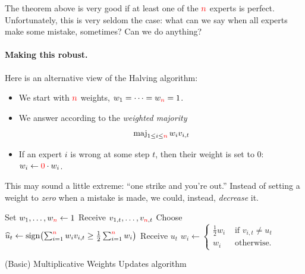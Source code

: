 The theorem above is very good if at least one of the ${\textcolor{red}{n}}$ experts is perfect. Unfortunately, this is very seldom the case: what can we say when all experts make some mistake, sometimes? Can we do anything?

\paragraph{Making this robust.}
Here is an alternative view of the Halving algorithm:
\begin{itemize}
    \item We start with ${\textcolor{red}{n}}$ weights, $w_1=\dots = w_{\textcolor{red}{n}} = 1$.
    \item We answer according to the \emph{weighted majority} \[
    \operatorname{maj}_{1\leq i\leq {\textcolor{red}{n}}} w_i v_{i,t}
    \]
    \item If an expert $i$ is wrong at some step $t$, then their weight is set to $0$: $w_i \gets \textcolor{red}{0}\cdot w_i$.
\end{itemize}
This may sound a little extreme: ``one strike and you're out.'' Instead of setting a weight to \emph{zero} when a mistake is made, we could, instead, \emph{decrease} it.

\begin{algorithm}[htbp]
\begin{algorithmic}[1]
    \State Set $w_1,\dots, w_{\textcolor{red}{n}} \gets  1$
        \State Receive $v_{1,t},\dots, v_{{\textcolor{red}{n}},t}$
        \State Choose $\widehat{u}_t \gets \sign\Paren{ \sum_{i=1}^\ns w_i v_{i,t} \geq \frac{1}{2}\sum_{i=1}^\ns w_i}$ 
        \State Receive $u_t$ 
         
        \State $w_i \gets \begin{cases}
            \frac{1}{2} w_i & \text{ if } v_{i,t} \neq u_t\\
            w_i & \text{ otherwise.}
            \end{cases}$~\label{alg:experts:mwu:halving:step}
        \EndFor
    \EndFor
\end{algorithmic}
\caption{(Basic) Multiplicative Weights Updates algorithm}\label{algo:wmu:1}
\end{algorithm}

